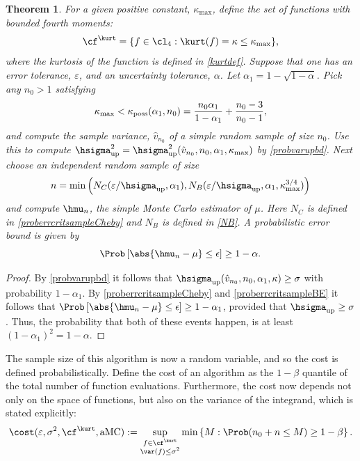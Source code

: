 \documentclass[12pt]{amsart}
\newcommand{\hv}{\hat{v}}
\newtheorem{theorem}{Theorem}
\DeclareMathOperator{\aMC}{aMC}
\begin{document}
\begin{theorem} \label{mainadaptthm} For a given positive constant, $\kappa_{\max}$, define the set of functions with bounded fourth moments:
\[
\cf^{\kurt}= \{f \in \cl_{4} : \kurt(f)= \kappa \le \kappa_{\max} \},
\]
where the kurtosis of the function is defined in \eqref{kurtdef}.
Suppose that one has an error tolerance, $\varepsilon$, and an uncertainty tolerance, $\alpha$. Let $\alpha_1 = 1 - \sqrt{1 - \alpha}$.  Pick any $n_0>1$ satisfying
\[
\kappa_{\max} < \kappa_{\text{\rm poss}}(\alpha_1,n_0)  = \frac{n_0 \alpha_1}{1-\alpha_1} + \frac{n_0-3}{n_0-1},
\]
and compute the sample variance, $\hv_{n_0}$ of a simple random sample of size $n_0$.   Use this to compute $\hsigma^2_{\text{\rm up}} = \hsigma^2_{\text{\rm up}}(\hv_{n_0},n_0,\alpha_1,\kappa_{\max})$ by \eqref{probvarupbd}.  Next choose an independent random sample of size
\[
n = \min\left( N_C(\varepsilon/\hsigma_{\text{\rm up}},\alpha_1), N_B(\varepsilon/\hsigma_{\text{\rm up}},\alpha_1,\kappa_{\max}^{3/4}) \right)
\]
and compute $\hmu_n$, the simple Monte Carlo estimator of $\mu$.  Here $N_C$ is defined in \eqref{proberrcritsampleCheby} and  $N_B$ is defined in \eqref{NB}.  A probabilistic error bound is given by
\[
\Prob\left[\abs{\hmu_n-\mu} \le \epsilon \right] \geq 1-\alpha.
\]
\end{theorem}
\begin{proof}
By \eqref{probvarupbd} it follows that $\hsigma_{\text{up}}(\hv_{n_0},n_0,\alpha_1,\kappa)  \ge \sigma$ with probability $1-\alpha_1$.  By  \eqref{proberrcritsampleCheby} and \eqref{proberrcritsampleBE} it follows that  $\Prob\left[\abs{\hmu_n-\mu} \le \epsilon \right] \geq 1-\alpha_1$, provided that $\hsigma_{\text{up}}  \ge \sigma$.  Thus, the probability that both of these events happen, is at least $(1-\alpha_1)^2=1-\alpha$.
\end{proof}

The sample size of this algorithm is now a random variable, and so the cost is defined probabilistically.  Define the cost of an algorithm as the $1-\beta$ quantile of the total number of function evaluations.  Furthermore, the cost now depends not only on the space of functions, but also on the variance of the integrand, which is stated explicitly:
\begin{equation}
\cost(\varepsilon,\sigma^2,\cf^{\kurt},\aMC) := \sup_{\substack{f \in \cf^{\kurt}\\ \var(f)\le \sigma^2} } \min\left\{M : \Prob(n_0 + n \le M) \ge 1-\beta  \right \}.
\end{equation}
\end{document}
